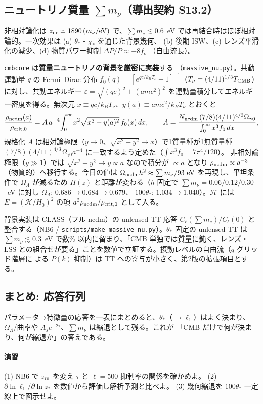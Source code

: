 \subsection{ニュートリノ質量 $\sum m_\nu$（導出契約 S13.2）}
非相対論化は $z_{\rm nr}\simeq1890\,(m_\nu/\mathrm{eV})$ で、$\sum m_\nu\lesssim0.6$~eV
では再結合時はほぼ相対論的。一次効果は (a) $\theta_*$・$\chi_*$ を通じた背景幾何、
(b) 後期 ISW、(c) レンズ平滑化の減少、(d) 物質パワー抑制 $\Delta P/P\approx-8f_\nu$
（自由流長）。

\texttt{cmbcore} は\textbf{質量ニュートリノの背景を厳密に実装}する
（\texttt{massive\_nu.py}）。共動運動量 $q$ の Fermi--Dirac 分布
$f_0(q)=[e^{q c/k_BT_\nu}+1]^{-1}$（$T_\nu=(4/11)^{1/3}T_{\rm CMB}$）に対し、共動エネルギー
$\varepsilon=\sqrt{(qc)^2+(amc^2)^2}$ を運動量積分してエネルギー密度を得る。無次元
$x\equiv qc/k_BT_\nu$、$y(a)\equiv amc^2/k_BT_\nu$ とおくと
\begin{equation}
  \frac{\rho_{\rm ncdm}(a)}{\rho_{\rm crit,0}}
  =A\,a^{-4}\!\int_0^\infty\! x^2\sqrt{x^2+y(a)^2}\,f_0(x)\,dx,
  \qquad
  A=\frac{N_{\rm ncdm}\,(7/8)(4/11)^{4/3}\Omega_{\gamma0}}{\int_0^\infty x^3 f_0\,dx},
  \label{eq:rho_ncdm}
\end{equation}
規格化 $A$ は相対論極限（$y\to0$、$\sqrt{x^2+y^2}\to x$）で1質量種が1無質量種
$(7/8)(4/11)^{4/3}\Omega_{\gamma0}a^{-4}$ に一致するよう定めた（$\int x^3f_0=7\pi^4/120$）。
非相対論極限（$y\gg1$）では $\sqrt{x^2+y^2}\to y\propto a$ なので積分が $\propto a$ となり
$\rho_{\rm ncdm}\propto a^{-3}$（物質的）へ移行する。今日の値は
$\Omega_{\rm ncdm}h^2\approx\sum m_\nu/93~\mathrm{eV}$ を再現し、平坦条件で
$\Omega_\Lambda$ が減るため $H(z)$ と距離が変わる（$h$ 固定で
$\sum m_\nu=0.06/0.12/0.30$~eV に対し $\Omega_\Lambda{:}\,0.686\!\to\!0.684\!\to\!0.679$、
$100\theta_*{:}\,1.034\!\to\!1.040$）。$\mathcal H$ には
$E=(\mathcal H/H_0)^2$ の項 $a^2\rho_{\rm ncdm}/\rho_{\rm crit,0}$ として入る。

\begin{numreality}
背景実装は CLASS（フル ncdm）の unlensed TT 応答 $C_\ell(\sum m_\nu)/C_\ell(0)$ と
整合する（NB6 / \texttt{scripts/make\_massive\_nu.py}）。$\theta_*$ 固定の unlensed TT は
$\sum m_\nu\lesssim0.3$~eV で数\% 以内に留まり、「CMB 単独では質量に鈍く、レンズ・
LSS との組合せが要る」ことを数値で立証する。摂動レベルの自由流（$q$ グリッド階層に
よる $P(k)$ 抑制）は TT への寄与が小さく、第2版の拡張項目とする。
\end{numreality}

\subsection{まとめ: 応答行列}
パラメータ→特徴量の応答を一表にまとめると、$\theta_*$（$\to\ell_1$）はよく決まり、
$\Omega_\Lambda$/曲率や $A_se^{-2\tau}$、$\sum m_\nu$ は縮退として残る。これが
「CMB だけで何が決まり、何が縮退か」の答えである。

\paragraph{演習}
(1) NB6 で $z_{\rm re}$ を変え $\tau$ と $\ell=500$ 抑制率の関係を確かめよ。
(2) $\partial\ln\ell_1/\partial\ln z_*$ を数値から評価し解析予測と比べよ。
(3) 幾何縮退を $100\theta_*$ 一定線上で図示せよ。
